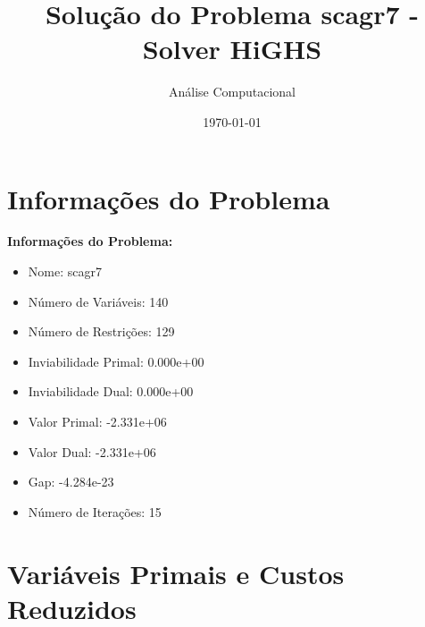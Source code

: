 \documentclass[12pt]{article}
\title{Solução do Problema scagr7 - Solver HiGHS}
\author{Análise Computacional}
\date{\today}
\begin{document}
\maketitle

\section{Informações do Problema}

\textbf{Informações do Problema:}
\begin{itemize}
\item Nome: scagr7
\item Número de Variáveis: 140
\item Número de Restrições: 129
\item Inviabilidade Primal: 0.000e+00
\item Inviabilidade Dual: 0.000e+00
\item Valor Primal: -2.331e+06
\item Valor Dual: -2.331e+06
\item Gap: -4.284e-23
\item Número de Iterações: 15
\end{itemize}


\section{Variáveis Primais e Custos Reduzidos}
\end{document}
